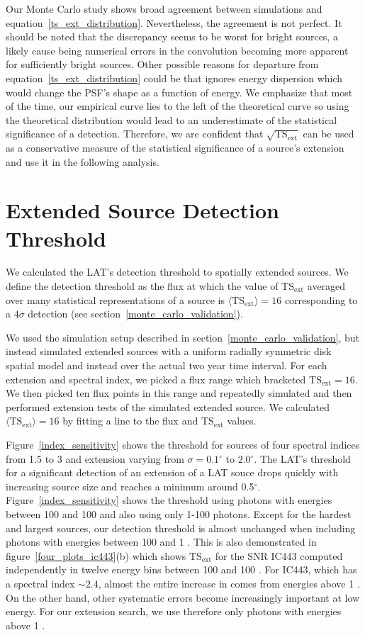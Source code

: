 \documentclass[12pt,preprint]{aastex}
\newcommand{\mev}{\text{MeV}\xspace}
\newcommand{\gev}{\text{GeV}\xspace}
\newcommand{\tsext}{{\ensuremath{\text{TS}_{\text{ext}}}}\xspace}
\newcommand{\ts}{\text{TS}\xspace}
\renewcommand{\deg}{\ensuremath{^\circ}\xspace}
\newcommand{\pointlike}{\text{\em pointlike}\xspace}
\renewcommand{\approx}{\sim\!\xspace}
\begin{document}
Our Monte Carlo study shows broad agreement between simulations and
equation~\ref{ts_ext_distribution}. Nevertheless, the agreement is not
perfect.  It should be noted that the discrepancy seems to be worst for
bright sources, a likely cause being numerical errors in the convolution
becoming more apparent for sufficiently bright sources.  Other possible
reasons for departure from equation~\ref{ts_ext_distribution} could
be that \pointlike ignores energy dispersion which would change the
PSF's shape as a function of energy. We emphasize that most of the
time, our empirical curve lies to the left of the theoretical curve so
using the theoretical distribution would lead to an underestimate of the
statistical significance of a detection. Therefore, we are confident that
$\sqrt{\tsext}$ can be used as a conservative measure of the statistical
significance of a source's extension and use it in the following analysis.

\section{Extended Source Detection Threshold}\label{extension_sensitivity}

We calculated the LAT's detection threshold to spatially extended
sources. We define the detection threshold as the flux at which the value
of $\tsext$ averaged over many statistical representations of a source
is $\langle\tsext\rangle=16$ corresponding to a $4\sigma$ detection
(see section~\ref{monte_carlo_validation}).

We used the simulation setup described in
section~\ref{monte_carlo_validation}, but instead simulated extended
sources with a uniform radially symmetric disk spatial model and
instead over the actual two year time interval.  For each extension and
spectral index, we picked a flux range which bracketed $\tsext=16$. We
then picked ten flux points in this range and repeatedly simulated
and then performed extension tests of the simulated extended source.
We calculated $\langle\tsext\rangle=16$ by fitting a line to the flux
and $\tsext$ values.

Figure~\ref{index_sensitivity} shows the threshold for sources of four
spectral indices from 1.5 to 3 and extension varying from $\sigma=0.1\deg$
to $2.0\deg$.  The LAT's threshold for a significant detection
of an extension of a LAT souce drops quickly with
increasing source size and reaches a minimum around 0.5\deg. 
Figure~\ref{index_sensitivity} shows
the threshold using photons with energies between 100 \mev and 100 \gev
and also using only 1-100\gev photons.
Except for the hardest and largest sources, our detection threshold is
almost unchanged when including photons with energies between 100 \mev and
1 \gev.  This is also demonstrated in figure~\ref{four_plots_ic443}(b)
which shows \tsext for the SNR IC443 computed independently in twelve
energy bins between 100 \mev and 100 \gev. For IC443, which has a
spectral index $\approx2.4$, almost the entire increase in \ts comes
from energies above 1 \gev.  On the other hand, other systematic errors
become increasingly important at low energy. For our extension search,
we use therefore only photons with energies above 1 \gev.
\end{document}
